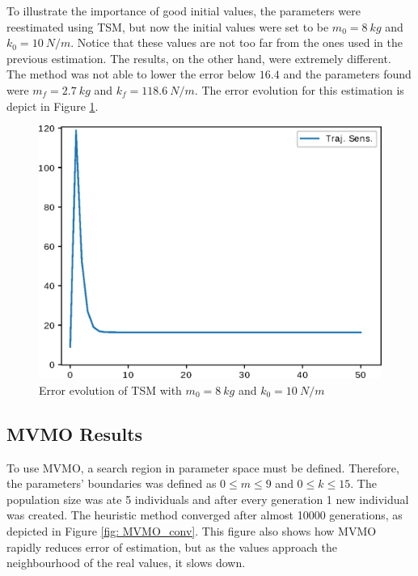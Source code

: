 To illustrate the importance of good initial values, the parameters were reestimated using TSM, but now the initial values were set to be $m_{0} = 8\ kg$ and $k_{0} = 10\ N/m$. Notice that these values are not too far from the ones used in the previous estimation. The results, on the other hand, were extremely different. The method was not able to lower the error below $16.4$ and the parameters found were $m_{f} = 2.7\ kg$ and $k_{f} = 118.6\ N/m$. The error evolution for this estimation is depict in Figure \ref{fig: TS_nconv}.

\begin{figure}[h]
	\caption{Error evolution of TSM with $m_{0} = 8\ kg$ and $k_{0} = 10\ N/m$}
	\begin{center}
		\includegraphics[scale=0.7]{Images/TS_nconv.eps}
	\end{center}
	\label{fig: TS_nconv}
\end{figure}

\subsection{MVMO Results}

To use MVMO, a search region in parameter space must be defined. Therefore, the parameters' boundaries was defined as $0 \leq m \leq 9$ and $0 \leq k \leq 15$. The population size was ate 5 individuals and after every generation 1 new individual was created. The heuristic method converged after almost 10000 generations, as depicted in Figure \ref{fig: MVMO_conv}. This figure also shows how MVMO rapidly reduces error of estimation, but as the values approach the neighbourhood of the real values, it slows down.

